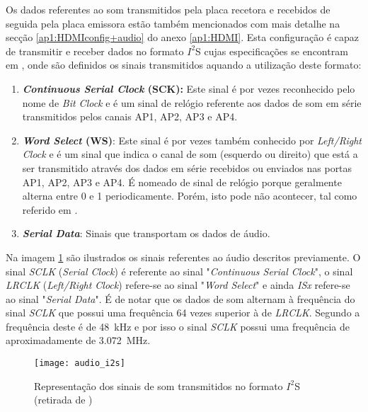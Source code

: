 Os dados referentes ao som transmitidos pela placa recetora e recebidos de seguida pela placa emissora estão também mencionados com mais detalhe na secção \ref{ap1:HDMIconfig+audio} do anexo \ref{ap1:HDMI}. Esta configuração é capaz de transmitir e receber dados no formato $I^{2}$S cujas especificações se encontram em \cite{R027}, onde são definidos os sinais transmitidos aquando a utilização deste formato:

\begin{enumerate}
	\item \textbf{\textit{Continuous Serial Clock} (SCK):} Este sinal é por vezes reconhecido pelo nome de \textit{Bit Clock} e é um sinal de relógio referente aos dados de som em série transmitidos pelos canais AP1, AP2, AP3 e AP4.
	
	\item \textbf{\textit{Word Select} (WS)}: Este sinal é por vezes também conhecido por \textit{Left/Right Clock} e é um sinal que indica o canal de som (esquerdo ou direito) que está a ser transmitido através dos dados em série recebidos ou enviados nas portas AP1, AP2, AP3 e AP4. É nomeado de sinal de relógio porque geralmente alterna entre 0 e 1 periodicamente. Porém, isto pode não acontecer, tal como referido em \cite{R027}. 
	
	\item \textbf{\textit{Serial Data}}: Sinais que transportam os dados de áudio.

\end{enumerate}

Na imagem \ref{fig:i2s_audio} são ilustrados os sinais referentes ao áudio descritos previamente. O sinal \textit{SCLK} (\textit{Serial Clock}) é referente ao sinal "\textit{Continuous Serial Clock}", o sinal \textit{LRCLK} (\textit{Left/Right Clock}) refere-se ao sinal "\textit{Word Select}" e ainda \textit{ISx }refere-se ao sinal "\textit{Serial Data}". É de notar que os dados de som alternam à frequência do sinal \textit{SCLK} que possui uma frequência 64 vezes superior à de \textit{LRCLK}. Segundo \cite{R014} a frequência deste é de \SI{48}{\kilo\hertz} e por isso o sinal \textit{SCLK} possui uma frequência de aproximadamente de  \SI{3.072}{\mega\hertz}.

\begin{figure}[h!]
	\begin{center}
		\leavevmode
		\texttt{[image: audio\_i2s]}
		\caption[IRepresentação dos sinais de som transmitidos no formato $I^{2}$S]{Representação dos sinais de som transmitidos no formato $I^{2}$S (retirada de \cite{R016})}
		\label{fig:i2s_audio}
	\end{center}
\end{figure}

